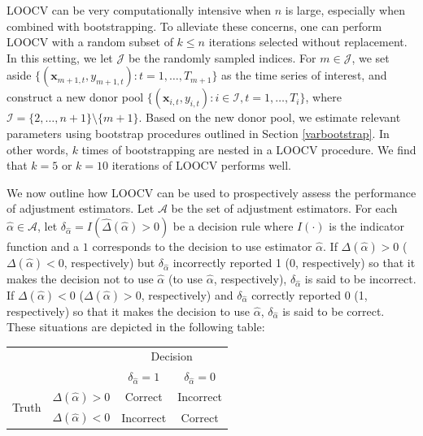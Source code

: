 \documentclass[11pt,3p,review,authoryear]{elsarticle}
\def\mbf#1{\mathbf{#1}} %
\def\mc#1{\mathcal{#1}} %
\theoremstyle{definition}
\begin{document}
LOOCV can be very computationally intensive when $n$ is large, especially when combined with bootstrapping. To alleviate these concerns, one can perform LOOCV with a random subset of $k \leq n$ iterations selected without replacement. In this setting, we let $\mc{J}$ be the randomly sampled indices. For $m \in \mc{J}$, we set aside $\{(\mbf{x}_{m + 1, t}, y_{m + 1, t}) \colon t = 1, \ldots, T_{m+1}\}$ as the time series of interest, and construct a new donor pool $\{(\mbf{x}_{i, t}, y_{i, t}) \colon i \in \mc{I}, t = 1, \ldots, T_{i}\}$, where $\mc{I}=\{2, \ldots, n+1\} \setminus \{m+1\}$. Based on the new donor pool, we estimate relevant parameters using bootstrap procedures outlined in Section \ref{varbootstrap}. In other words, $k$ times of bootstrapping are nested in a LOOCV procedure.  We find that $k=5$ or $k=10$ iterations of LOOCV performs well.

We now outline how LOOCV can be used to prospectively assess the performance of adjustment estimators. Let $\mc{A}$ be the set of adjustment estimators. For each $\hat{\alpha} \in \mc{A}$, let $\delta_{\hat{\alpha}} = I(\hat\Delta(\hat{\alpha})>0)$ be a decision rule where $I(\cdot)$ is the indicator function and a $1$ corresponds to the decision to use  estimator $\hat\alpha$. If $\Delta(\hat{\alpha})>0$ ($\Delta(\hat{\alpha})<0$, respectively) but $\delta_{\hat{\alpha}}$ incorrectly reported 1 (0, respectively) so that it makes the decision not to use $\hat{\alpha}$ (to use $\hat{\alpha}$, respectively), $\delta_{\hat{\alpha}}$ is said to be incorrect. If $\Delta(\hat{\alpha})<0$ ($\Delta(\hat{\alpha})>0$, respectively) and  $\delta_{\hat{\alpha}}$ correctly reported 0 (1, respectively) so that it makes the decision to use $\hat{\alpha}$, $\delta_{\hat{\alpha}}$ is said to be correct. These situations are depicted in the following table: \vspace*{0.3cm}

\begin{center}
  \begin{center}
      \begin{tabular}{cc|c|c}
        \hline
        & & \multicolumn{2}{c}{Decision} \\
        & & $\delta_{\hat{\alpha}} = 1$ & $\delta_{\hat{\alpha}} = 0$ \\ 
                \hline
     \multirow{2}{*}{Truth}  & $\Delta(\hat{\alpha})>0$ & Correct & Incorrect \\
      \cline{3-4}
      & $\Delta(\hat{\alpha})<0$  & Incorrect & Correct \\
      \hline
      \end{tabular}
  \end{center}
\end{center} 
\vspace*{0.3cm}
\end{document}
